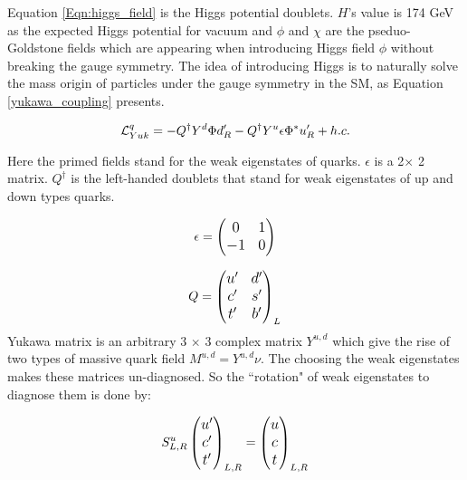  Equation \ref{Eqn:higgs_field} is the Higgs potential doublets. $H$'s value is 174 GeV as the expected Higgs potential for vacuum and $\phi$ and $\chi$ are the pseduo-Goldstone fields which are appearing when introducing Higgs field  $\phi$ without breaking the gauge symmetry. The idea of introducing Higgs is to naturally solve the mass origin of particles under the gauge symmetry in the SM, as Equation  \ref{yukawa_coupling} presents. 

\begin{equation}{\label{yukawa_coupling}}
\large
\mathcal{L}_{Yuk}^q = 
-{Q}^\dag Y^d \Phi d_R^\prime 
-{Q}^\dag Y^u \epsilon \Phi^* u_R^\prime
+ h.c.
\end{equation}

Here the primed fields stand for the weak eigenstates of quarks. $\epsilon$ is a 2$\times$ 2 matrix. $Q^\dag$ is the left-handed doublets that stand for weak eigenstates of up and down types quarks. 

\begin{equation}
\large
\epsilon =  
\begin{pmatrix}
0 & 1\\
-1 & 0
\end{pmatrix}
\end{equation}

\begin{equation}
\large
Q =  
\begin{pmatrix}
u^\prime & d^\prime \\
c^\prime & s^\prime \\
t^\prime & b^\prime
\end{pmatrix}_L
\end{equation}
Yukawa matrix is an arbitrary 3 $\times$ 3 complex matrix $Y^{u,d}$ which give the rise of two types of massive quark field $M^{u,d}=Y^{u,d}\nu$. The choosing the weak eigenstates makes these matrices un-diagnosed. So the ``rotation" of weak eigenstates to diagnose them is done by:

\begin{equation}\label{rot1}
\large
S_{L,R}^{u}
\begin{pmatrix}
u^\prime   \\
c^\prime  \\
t^\prime 
\end{pmatrix}_{L,R}
= \begin{pmatrix}
u  \\
c  \\
t 
\end{pmatrix}_{L,R}
\end{equation}

